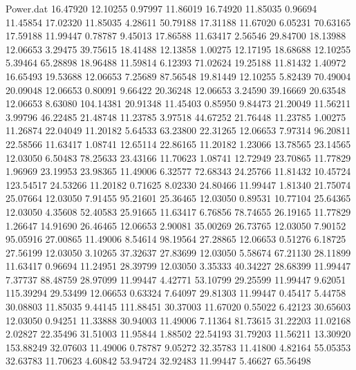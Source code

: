 \begin{filecontents}{Power.dat}
  16.47920   12.10255    0.97997   11.86019
  16.74920   11.85035    0.96694   11.45854
  17.02320   11.85035    4.28611   50.79188
  17.31188   11.67020    6.05231   70.63165
  17.59188   11.99447    0.78787    9.45013
  17.86588   11.63417    2.56546   29.84700
  18.13988   12.06653    3.29475   39.75615
  18.41488   12.13858    1.00275   12.17195
  18.68688   12.10255    5.39464   65.28898
  18.96488   11.59814    6.12393   71.02624
  19.25188   11.81432    1.40972   16.65493
  19.53688   12.06653    7.25689   87.56548
  19.81449   12.10255    5.82439   70.49004
  20.09048   12.06653    0.80091    9.66422
  20.36248   12.06653    3.24590   39.16669
  20.63548   12.06653    8.63080  104.14381
  20.91348   11.45403    0.85950    9.84473
  21.20049   11.56211    3.99796   46.22485
  21.48748   11.23785    3.97518   44.67252
  21.76448   11.23785    1.00275   11.26874
  22.04049   11.20182    5.64533   63.23800
  22.31265   12.06653    7.97314   96.20811
  22.58566   11.63417    1.08741   12.65114
  22.86165   11.20182    1.23066   13.78565
  23.14565   12.03050    6.50483   78.25633
  23.43166   11.70623    1.08741   12.72949
  23.70865   11.77829    1.96969   23.19953
  23.98365   11.49006    6.32577   72.68343
  24.25766   11.81432   10.45724  123.54517
  24.53266   11.20182    0.71625    8.02330
  24.80466   11.99447    1.81340   21.75074
  25.07664   12.03050    7.91455   95.21601
  25.36465   12.03050    0.89531   10.77104
  25.64365   12.03050    4.35608   52.40583
  25.91665   11.63417    6.76856   78.74655
  26.19165   11.77829    1.26647   14.91690
  26.46465   12.06653    2.90081   35.00269
  26.73765   12.03050    7.90152   95.05916
  27.00865   11.49006    8.54614   98.19564
  27.28865   12.06653    0.51276    6.18725
  27.56199   12.03050    3.10265   37.32637
  27.83699   12.03050    5.58674   67.21130
  28.11899   11.63417    0.96694   11.24951
  28.39799   12.03050    3.35333   40.34227
  28.68399   11.99447    7.37737   88.48759
  28.97099   11.99447    4.42771   53.10799
  29.25599   11.99447    9.62051  115.39294
  29.53499   12.06653    0.63324    7.64097
  29.81303   11.99447    0.45417    5.44758
  30.08803   11.85035    9.44145  111.88451
  30.37003   11.67020    0.55022    6.42123
  30.65603   12.03050    0.94251   11.33888
  30.94003   11.49006    7.11364   81.73615
  31.22203   11.02168    2.02827   22.35496
  31.51003   11.95844    1.88502   22.54193
  31.79203   11.56211   13.30920  153.88249
  32.07603   11.49006    0.78787    9.05272
  32.35783   11.41800    4.82164   55.05353
  32.63783   11.70623    4.60842   53.94724
  32.92483   11.99447    5.46627   65.56498

\end{filecontents}
